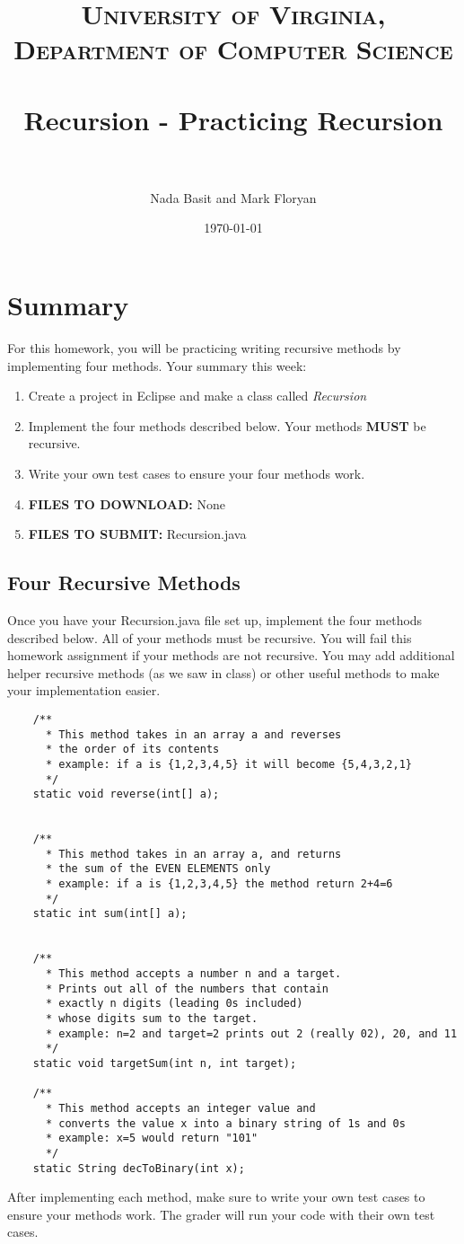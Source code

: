 \documentclass[paper=a4, fontsize=11pt, parskip=full]{scrartcl} %
\title{
\normalfont \normalsize
\textsc{University of Virginia, Department of Computer Science} \\ [25pt] %
\horrule{0.5pt} \\[0.4cm] %
\huge Recursion - Practicing Recursion \\ %
\horrule{2pt} \\[0.5cm] %
}
\author{Nada Basit and Mark Floryan}
\date{\normalsize\today} %
\numberwithin{equation}{section} %
\numberwithin{figure}{section} %
\numberwithin{table}{section} %
\begin{document}
\maketitle %


\section{Summary}

For this homework, you will be practicing writing recursive methods by implementing four methods. Your summary this week:

\begin{enumerate}
	\item Create a project in Eclipse and make a class called \emph{Recursion}
	\item Implement the four methods described below. Your methods \textbf{MUST} be recursive.
	\item Write your own test cases to ensure your four methods work.
	\item \textbf{FILES TO DOWNLOAD:} None
	\item \textbf{FILES TO SUBMIT:} Recursion.java
\end{enumerate}


\subsection{Four Recursive Methods}

Once you have your Recursion.java file set up, implement the four methods described below. All of your methods must be recursive. You will fail this homework assignment if your methods are not recursive. You may add additional helper recursive methods (as we saw in class) or other useful methods to make your implementation easier.

\begin{lstlisting}
	/**
	  * This method takes in an array a and reverses
	  * the order of its contents
	  * example: if a is {1,2,3,4,5} it will become {5,4,3,2,1}
	  */
	static void reverse(int[] a);
	

	/**
	  * This method takes in an array a, and returns
	  * the sum of the EVEN ELEMENTS only
	  * example: if a is {1,2,3,4,5} the method return 2+4=6
	  */
	static int sum(int[] a);
	

	/**
	  * This method accepts a number n and a target.
	  * Prints out all of the numbers that contain
	  * exactly n digits (leading 0s included)
	  * whose digits sum to the target.
	  * example: n=2 and target=2 prints out 2 (really 02), 20, and 11
	  */
	static void targetSum(int n, int target);

	/**
	  * This method accepts an integer value and
	  * converts the value x into a binary string of 1s and 0s
	  * example: x=5 would return "101"
	  */
	static String decToBinary(int x);
\end{lstlisting}

After implementing each method, make sure to write your own test cases to ensure your methods work. The grader will run your code with their own test cases.


\end{document}
